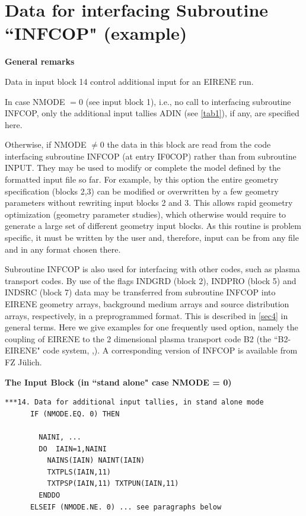 \section{Data for interfacing Subroutine ``INFCOP" (example)} \label{sec2.14}

\textbf{General remarks} 

\medskip 

Data in input block 14 control additional input for an EIRENE run.
%

In case NMODE $= 0$ (see input block 1), i.e., no call to interfacing
subroutine INFCOP, only the additional input tallies ADIN (see \cref{tab1}), if
any, are specified here.

Otherwise, if NMODE $\neq 0$ the data in this block are read from the code
interfacing subroutine INFCOP (at entry IF0COP) rather than from subroutine
INPUT.
They may be used to modify or complete the model defined by the formatted input
file so far.
For example, by this option the entire geometry specification (blocks 2,3) can
be modified or overwritten by a few geometry parameters without rewriting input
blocks 2 and 3.
This allows rapid geometry optimization (geometry parameter studies), which
otherwise would require to generate a large set of different geometry input
blocks.
As this routine is problem specific, it must be written by the user and,
therefore, input can be from any file and in any format chosen there.

Subroutine INFCOP is also used for interfacing with other codes, such as plasma
transport codes.
By use of the flags INDGRD (block 2), INDPRO (block 5) and INDSRC (block 7)
data may be transferred from subroutine INFCOP into EIRENE geometry arrays,
background medium arrays and source distribution arrays, respectively, in a
preprogrammed format.
This is described in \cref{sec4} in general terms.
Here we give examples for one frequently used option, namely the coupling of
EIRENE to the 2 dimensional plasma transport code B2 \cite{kn:Braams} (the
``B2-EIRENE" code system, \cite{kn:Reiter91b},\cite{kn:Reiter92b}).
A corresponding version of INFCOP is available from FZ J\"ulich.

\textbf{The Input Block (in ``stand alone" case NMODE = 0)} 

\begin{lstlisting}
***14. Data for additional input tallies, in stand alone mode
      IF (NMODE.EQ. 0) THEN

        NAINI, ...
        DO  IAIN=1,NAINI
          NAINS(IAIN) NAINT(IAIN)
          TXTPLS(IAIN,11)
          TXTPSP(IAIN,11) TXTPUN(IAIN,11)
        ENDDO
      ELSEIF (NMODE.NE. 0) ... see paragraphs below
\end{lstlisting} 

